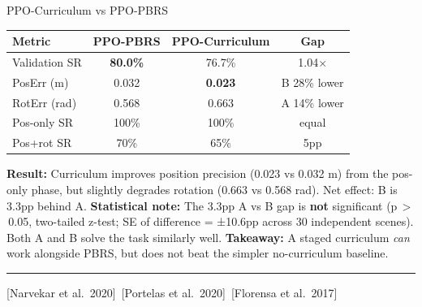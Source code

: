 \documentclass[aspectratio=169,xcolor=dvipsnames,t]{beamer}
\newcommand{\litfooter}[1]{%
  \vspace{2pt}%
  \hrule%
  \vspace{2pt}%
  {\tiny\color{LightDarkGrey} #1}%
}
\begin{document}
\begin{frame}[t]{PPO-Curriculum vs PPO-PBRS}
  \begin{center}
  \footnotesize
  \begin{tabular}{lccc}
    \toprule
    \textbf{Metric} & \textbf{PPO-PBRS} & \textbf{PPO-Curriculum} & \textbf{Gap} \\
    \midrule
    Validation SR & \textcolor{hlgreen}{\textbf{80.0\%}} & 76.7\% & 1.04$\times$ \\
    PosErr (m) & 0.032 & \textcolor{hlgreen}{\textbf{0.023}} & B 28\% lower \\
    RotErr (rad) & 0.568 & 0.663 & A 14\% lower \\
    Pos-only SR & 100\% & 100\% & equal \\
    Pos+rot SR & 70\% & 65\% & 5pp \\
    \bottomrule
  \end{tabular}
  \end{center}
  \vspace{1pt}
  {\scriptsize \textbf{Result:} Curriculum improves position precision (0.023 vs 0.032 m) from the pos-only phase, but slightly degrades rotation (0.663 vs 0.568 rad). Net effect: B is 3.3pp behind A.}
  {\scriptsize \textbf{Statistical note:} The 3.3pp A vs B gap is \textbf{not} significant (p\,$>$\,0.05, two-tailed z-test; SE of difference = ±10.6pp across 30 independent scenes). Both A and B solve the task similarly well.}
  {\scriptsize \textbf{Takeaway:} A staged curriculum \emph{can} work alongside PBRS, but does not beat the simpler no-curriculum baseline.}

  \vfill\litfooter{[Narvekar et al.\ 2020]~[Portelas et al.\ 2020]~[Florensa et al.\ 2017]}
\end{frame}

\end{document}
